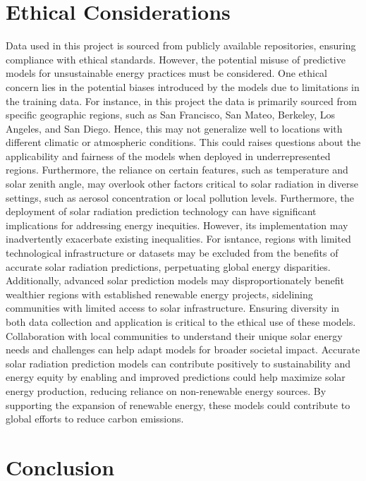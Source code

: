 \documentclass[10pt,twocolumn]{article}
\begin{document}
\begin{itemize}
\section{Ethical Considerations}

Data used in this project is sourced from publicly available repositories, ensuring compliance with ethical standards. However, the potential misuse of predictive models for unsustainable energy practices must be considered. One ethical concern lies in the potential biases introduced by the models due to limitations in the training data. For instance, in this project the data is primarily sourced from specific geographic regions, such as San Francisco, San Mateo, Berkeley, Los Angeles, and San Diego. Hence, this may not generalize well to locations with different climatic or atmospheric conditions. This could raises questions about the applicability and fairness of the models when deployed in underrepresented regions. Furthermore, the reliance on certain features, such as temperature and solar zenith angle, may overlook other factors critical to solar radiation in diverse settings, such as aerosol concentration or local pollution levels. Furthermore, the deployment of solar radiation prediction technology can have significant implications for addressing energy inequities. However, its implementation may inadvertently exacerbate existing inequalities. For isntance, regions with limited technological infrastructure or datasets may be excluded from the benefits of accurate solar radiation predictions, perpetuating global energy disparities. Additionally, advanced solar prediction models may disproportionately benefit wealthier regions with established renewable energy projects, sidelining communities with limited access to solar infrastructure. Ensuring diversity in both data collection and application is critical to the ethical use of these models. Collaboration with local communities to understand their unique solar energy needs and challenges can help adapt models for broader societal impact. Accurate solar radiation prediction models can contribute positively to sustainability and energy equity by enabling and improved predictions could help maximize solar energy production, reducing reliance on non-renewable energy sources. By supporting the expansion of renewable energy, these models could contribute to global efforts to reduce carbon emissions.
\section{Conclusion}


\end{itemize}
\end{document}
